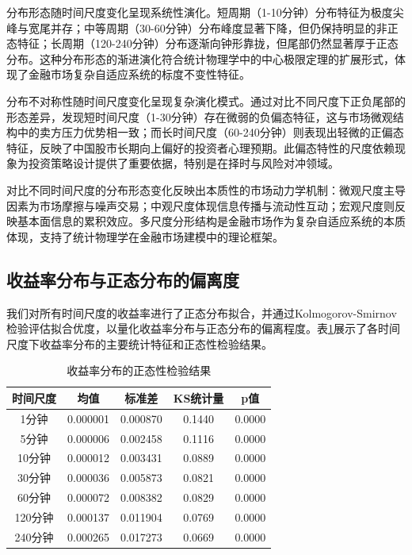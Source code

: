 \documentclass[12pt, a4paper]{article}
\begin{document}
分布形态随时间尺度变化呈现系统性演化。短周期（1-10分钟）分布特征为极度尖峰与宽尾并存；中等周期（30-60分钟）分布峰度显著下降，但仍保持明显的非正态特征；长周期（120-240分钟）分布逐渐向钟形靠拢，但尾部仍然显著厚于正态分布。这种分布形态的渐进演化符合统计物理学中的中心极限定理的扩展形式，体现了金融市场复杂自适应系统的标度不变性特征。

分布不对称性随时间尺度变化呈现复杂演化模式。通过对比不同尺度下正负尾部的形态差异，发现短时间尺度（1-30分钟）存在微弱的负偏态特征，这与市场微观结构中的卖方压力优势相一致；而长时间尺度（60-240分钟）则表现出轻微的正偏态特征，反映了中国股市长期向上偏好的投资者心理预期。此偏态特性的尺度依赖现象为投资策略设计提供了重要依据，特别是在择时与风险对冲领域。

对比不同时间尺度的分布形态变化反映出本质性的市场动力学机制：微观尺度主导因素为市场摩擦与噪声交易；中观尺度体现信息传播与流动性互动；宏观尺度则反映基本面信息的累积效应。多尺度分形结构是金融市场作为复杂自适应系统的本质体现，支持了统计物理学在金融市场建模中的理论框架。
\subsection{收益率分布与正态分布的偏离度}

我们对所有时间尺度的收益率进行了正态分布拟合，并通过Kolmogorov-Smirnov检验评估拟合优度，以量化收益率分布与正态分布的偏离程度。表\ref{tab:normality_test}展示了各时间尺度下收益率分布的主要统计特征和正态性检验结果。

\begin{table}[htbp]
\centering
\caption{收益率分布的正态性检验结果}
\label{tab:normality_test}
\begin{tabular}{ccccc}
\toprule
时间尺度 & 均值 & 标准差 & KS统计量 & p值 \\
\midrule
1分钟 & 0.000001 & 0.000870 & 0.1440 & 0.0000 \\
5分钟 & 0.000006 & 0.002458 & 0.1116 & 0.0000 \\
10分钟 & 0.000012 & 0.003431 & 0.0889 & 0.0000 \\
30分钟 & 0.000036 & 0.005873 & 0.0821 & 0.0000 \\
60分钟 & 0.000072 & 0.008382 & 0.0829 & 0.0000 \\
120分钟 & 0.000137 & 0.011904 & 0.0769 & 0.0000 \\
240分钟 & 0.000265 & 0.017273 & 0.0669 & 0.0000 \\
\bottomrule
\end{tabular}
\end{table}
\end{document}
